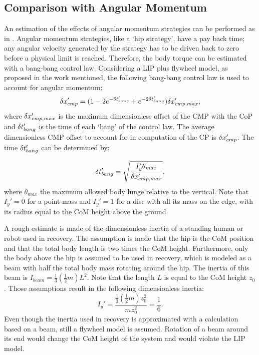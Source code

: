 \subsection{Comparison with Angular Momentum}
An estimation of the effects of angular momentum strategies can be performed as in \cite{koolen2012capturability}. Angular momentum strategies, like a `hip strategy', have a pay back time; any angular velocity generated by the strategy has to be driven back to zero before a physical limit is reached. Therefore, the body torque can be estimated with a bang-bang control law.  Considering a \ac{LIP} plus flywheel model, as proposed in the work mentioned, the following bang-bang control law is used to account for angular momentum:
\begin{equation}
\delta x_{cmp}' = (1-2e^{-\delta t_{bang}'}+e^{-2\delta t_{bang}'})\delta x_{cmp,max}',
\end{equation}
where $\delta x_{cmp,max}'$ is the maximum dimensionless offset of the \ac{CMP} with the \ac{CoP} and $\delta t_{bang}'$ is the time of each `bang' of the control law. The average dimensionless \ac{CMP} offset to account for in computation of the \ac{CP} is $\delta x_{cmp}'$. The time $\delta t_{bang}'$ can be determined by:

\begin{equation}
\delta t_{bang}' = \sqrt{\frac{I_y'\theta_{max}}{\delta x_{cmp,max}'}},
\end{equation}
where $\theta_{max}$ the maximum allowed body lunge relative to the vertical. Note that $I_y'=0$ for a point-mass and $I_y'=1$ for a disc with all its mass on the edge, with its radius equal to the \ac{CoM} height above the ground. 

A rough estimate is made of the dimensionless inertia of a standing human or robot used in recovery. The assumption is made that the hip is the \ac{CoM} position \cite{gard2004comparison} and that the total body length is two times the \ac{CoM} height. Furthermore, only the body above the hip is assumed to be used in recovery, which is modeled as a beam with half the total body mass rotating around the hip. The inertia of this beam is $I_{beam} = \frac{1}{3}(\frac{1}{2}m)L^2$. Note that the length $L$ is equal to the \ac{CoM} height $z_0$. Those assumptions result in the following dimensionless inertia:
\begin{equation}
	I_y' = \frac{\frac{1}{3}(\frac{1}{2}m)z_0^2}{mz_0^2} = \frac{1}{6}.
\end{equation}
Even though the inertia used in recovery is approximated with a calculation based on a beam, still a flywheel model is assumed. Rotation of a beam around its end would change the \ac{CoM} height of the system and would violate the \ac{LIP} model.

